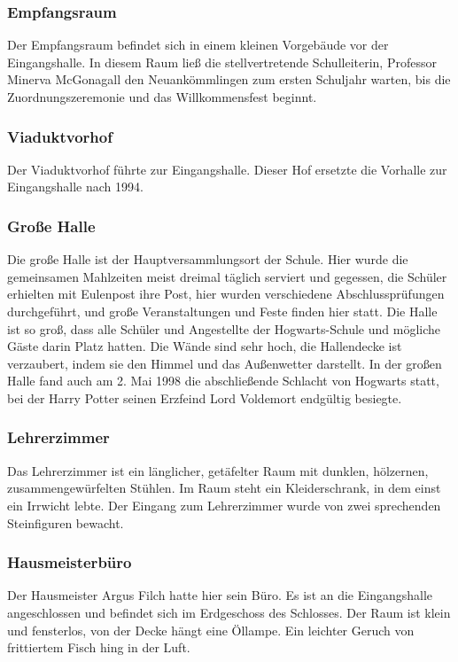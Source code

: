 \documentclass[a4paper, 10pt]{article}
\begin{document}
\subsubsection*{\large Empfangsraum}
Der Empfangsraum befindet sich in einem kleinen Vorgebäude vor der Eingangshalle. In diesem Raum ließ die stellvertretende Schulleiterin, Professor Minerva McGonagall den Neuankömmlingen zum ersten Schuljahr warten, bis die Zuordnungszeremonie und das Willkommensfest beginnt.
\subsubsection*{\large Viaduktvorhof}
Der Viaduktvorhof führte zur Eingangshalle. Dieser Hof ersetzte die Vorhalle zur Eingangshalle nach 1994.
\subsubsection*{\large Große Halle}
Die große Halle ist der Hauptversammlungsort der Schule. Hier wurde die gemeinsamen Mahlzeiten meist dreimal täglich serviert und gegessen, die Schüler erhielten mit Eulenpost ihre Post, hier wurden verschiedene Abschlussprüfungen durchgeführt, und große Veranstaltungen und Feste finden hier statt. Die Halle ist so groß, dass alle Schüler und Angestellte der Hogwarts-Schule und mögliche Gäste darin Platz hatten. Die Wände sind sehr hoch, die Hallendecke ist verzaubert, indem sie den Himmel und das Außenwetter darstellt.
\vspace{10pt}
\newline
In der großen Halle fand auch am 2. Mai 1998 die abschließende Schlacht von Hogwarts statt, bei der Harry Potter seinen Erzfeind Lord Voldemort endgültig besiegte.
\subsubsection*{\large Lehrerzimmer}
Das Lehrerzimmer ist ein länglicher, getäfelter Raum mit dunklen, hölzernen, zusammengewürfelten Stühlen. Im Raum steht ein Kleiderschrank, in dem einst ein Irrwicht lebte. Der Eingang zum Lehrerzimmer wurde von zwei sprechenden Steinfiguren bewacht.
\subsubsection*{\large Hausmeisterbüro}
Der Hausmeister Argus Filch hatte hier sein Büro. Es ist an die Eingangshalle angeschlossen und befindet sich im Erdgeschoss des Schlosses. Der Raum ist klein und fensterlos, von der Decke hängt eine Öllampe. Ein leichter Geruch von frittiertem Fisch hing in der Luft.
\end{document}
